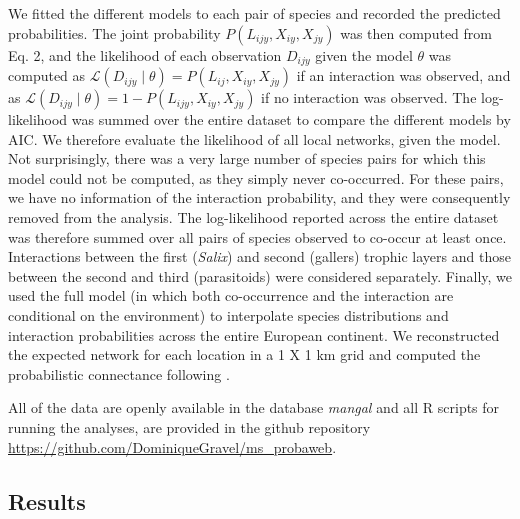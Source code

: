 \documentclass[12pt]{article}
\begin{document}
We fitted the different models to each pair of species and recorded the
predicted probabilities. The joint probability $P(L_{ijy},X_{iy},X_{jy})$ was
then computed from Eq. 2, and the likelihood of each observation $D_{ijy}$
given the model $\theta$ was computed as
$\mathcal{L}(D_{ijy}\mid \theta)=P(L_{ij},X_{iy},X_{jy})$ if an interaction was
observed, and as $\mathcal{L}(D_{ijy}\mid \theta) = 1-P(L_{ijy}, X_{iy}, X_{jy})$
if no interaction was observed. The log-likelihood was summed over the entire
dataset to compare the different models by AIC. We therefore evaluate the
likelihood of all local networks, given the model. Not surprisingly, there was
a very large number of species pairs for which this model could not be
computed, as they simply never co-occurred. For these pairs, we have no
information of the interaction probability, and they were consequently removed
from the analysis. The log-likelihood reported across the entire dataset was
therefore summed over all pairs of species observed to co-occur at least once.
Interactions between the first (\textit{Salix}) and second (gallers) trophic
layers and those between the second and third (parasitoids) were considered
separately. Finally, we used the full model (in which both co-occurrence and
the interaction are conditional on the environment) to interpolate species
distributions and interaction probabilities across the entire European
continent. We reconstructed the expected network for each location in a 1 X 1
km grid and computed the probabilistic connectance following
\citet{Poisot2015c}.

All of the data are openly available in the database \emph{mangal}
\citep{Poisot2015b} and all R scripts for running the analyses, are provided
in the github repository
\url{https://github.com/DominiqueGravel/ms_probaweb}.

\subsection*{Results}
\end{document}
